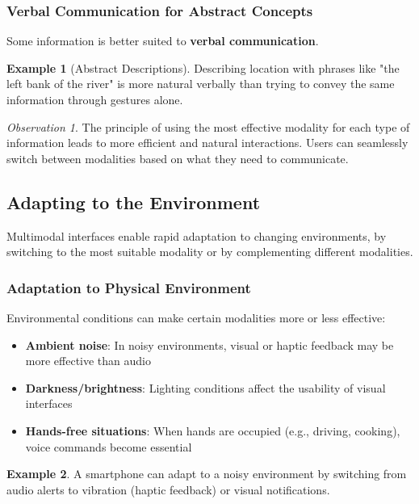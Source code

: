 \documentclass[11pt,a4paper]{article}
\theoremstyle{definition}
\newtheorem{example}{Example}[section]
\theoremstyle{plain}
\theoremstyle{remark}
\newtheorem*{observation}{Observation}
\begin{document}
\subsubsection{Verbal Communication for Abstract Concepts}

Some information is better suited to \textbf{verbal communication}.

\begin{example}[Abstract Descriptions]
Describing location with phrases like "the left bank of the river" is more natural verbally than trying to convey the same information through gestures alone.
\end{example}

\begin{observation}
The principle of using the most effective modality for each type of information leads to more efficient and natural interactions. Users can seamlessly switch between modalities based on what they need to communicate.
\end{observation}

\subsection{Adapting to the Environment}

Multimodal interfaces enable rapid adaptation to changing environments, by switching to the most suitable modality or by complementing different modalities.

\subsubsection{Adaptation to Physical Environment}

Environmental conditions can make certain modalities more or less effective:

\begin{itemize}
    \item \textbf{Ambient noise}: In noisy environments, visual or haptic feedback may be more effective than audio
    \item \textbf{Darkness/brightness}: Lighting conditions affect the usability of visual interfaces
    \item \textbf{Hands-free situations}: When hands are occupied (e.g., driving, cooking), voice commands become essential
\end{itemize}

\begin{example}
A smartphone can adapt to a noisy environment by switching from audio alerts to vibration (haptic feedback) or visual notifications.
\end{example}
\end{document}
